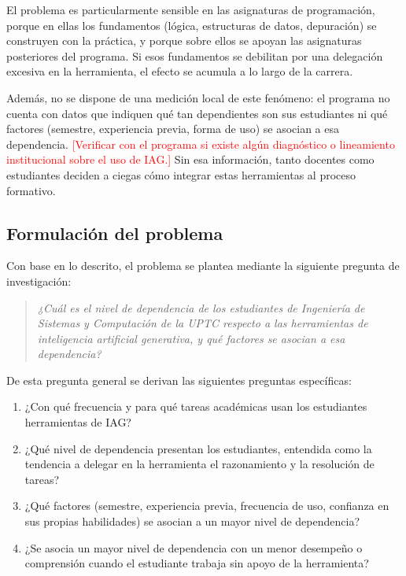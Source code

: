 \documentclass[12pt,letterpaper]{article}
\newcommand{\pendiente}[1]{\textcolor{red}{[#1]}}
\begin{document}
El problema es particularmente sensible en las asignaturas de programación, porque en ellas los fundamentos (lógica, estructuras de datos, depuración) se construyen con la práctica, y porque sobre ellos se apoyan las asignaturas posteriores del programa. Si esos fundamentos se debilitan por una delegación excesiva en la herramienta, el efecto se acumula a lo largo de la carrera.

Además, no se dispone de una medición local de este fenómeno: el programa no cuenta con datos que indiquen qué tan dependientes son sus estudiantes ni qué factores (semestre, experiencia previa, forma de uso) se asocian a esa dependencia. \pendiente{Verificar con el programa si existe algún diagnóstico o lineamiento institucional sobre el uso de IAG.} Sin esa información, tanto docentes como estudiantes deciden a ciegas cómo integrar estas herramientas al proceso formativo.

\subsection{Formulación del problema}

Con base en lo descrito, el problema se plantea mediante la siguiente pregunta de investigación:

\begin{quote}
\emph{¿Cuál es el nivel de dependencia de los estudiantes de Ingeniería de Sistemas y Computación de la UPTC respecto a las herramientas de inteligencia artificial generativa, y qué factores se asocian a esa dependencia?}
\end{quote}

De esta pregunta general se derivan las siguientes preguntas específicas:

\begin{enumerate}
  \item ¿Con qué frecuencia y para qué tareas académicas usan los estudiantes herramientas de IAG?
  \item ¿Qué nivel de dependencia presentan los estudiantes, entendida como la tendencia a delegar en la herramienta el razonamiento y la resolución de tareas?
  \item ¿Qué factores (semestre, experiencia previa, frecuencia de uso, confianza en sus propias habilidades) se asocian a un mayor nivel de dependencia?
  \item ¿Se asocia un mayor nivel de dependencia con un menor desempeño o comprensión cuando el estudiante trabaja sin apoyo de la herramienta?
\end{enumerate}
\end{document}
